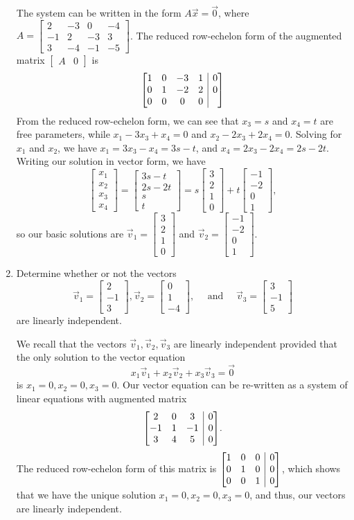 \documentclass[12pt]{article}
\makeatletter
\newenvironment{amatrix}[1]{%
  \left[\begin{array}{@{}*{#1}{c}|c@{}}
}{%
  \end{array}\right]
}
\newcommand{\bbm}{\begin{bmatrix}}
\newcommand{\ebm}{\end{bmatrix}}
\newcommand{\bam}{\begin{amatrix}}
\newcommand{\eam}{\end{amatrix}}
\makeatother
\begin{document}
\begin{enumerate}
The system can be written in the form $A\vec{x}=\vec{0}$, where $A = \bbm 2&-3&0&-4\\-1&2&-3&3\\3&-4&-1&-5\ebm$. The reduced row-echelon form of the augmented matrix $[\begin{array}{c|c} A&0\end{array}]$ is
\[
 \bam{4}1&0&-3&1&0\\0&1&-2&2&0\\0&0&0&0&\eam
\]
From the reduced row-echelon form, we can see that $x_3=s$ and $x_4=t$ are free parameters, while $x_1-3x_3+x_4=0$ and $x_2-2x_3+2x_4=0$. Solving for $x_1$ and $x_2$, we have $x_1=3x_3-x_4=3s-t$, and $x_4 = 2x_3-2x_4 = 2s-2t$. Writing our solution in vector form, we have
\[
 \bbm x_1\\x_2\\x_3\\x_4\ebm = \bbm 3s-t\\2s-2t\\s\\t\ebm = s\bbm 3\\2\\1\\0\ebm+t\bbm -1\\-2\\0\\1\ebm,
\]
so our basic solutions are $\vec{v}_1 = \bbm 3\\2\\1\\0\ebm$ and $\vec{v}_2 = \bbm -1\\-2\\0\\1\ebm$.


\newpage

\item Determine whether or not the vectors
\[
 \vec{v}_1 = \bbm 2\\-1\\3\ebm, \vec{v}_2 = \bbm 0\\1\\-4\ebm, \quad \text{ and } \quad \vec{v}_3 = \bbm 3\\-1\\5\ebm
\]
are linearly independent.

\bigskip

We recall that the vectors $\vec{v}_1, \vec{v}_2, \vec{v}_3$ are linearly independent provided that the only solution to the vector equation
\[
 x_1\vec{v}_1+x_2\vec{v}_2+x_3\vec{v}_3 = \vec{0}
\]
is $x_1=0, x_2=0, x_3=0$. Our vector equation can be re-written as a system of linear equations with augmented matrix
\[
 \bam{3}2&0&3&0\\-1&1&-1&0\\3&4&5&0\eam.
\]
The reduced row-echelon form of this matrix is $\bam{3}1&0&0&0\\0&1&0&0\\0&0&1&0\eam$, which shows that we have the unique solution $x_1=0,x_2=0,x_3=0$, and thus, our vectors are linearly independent.


\end{enumerate}
\end{document}
